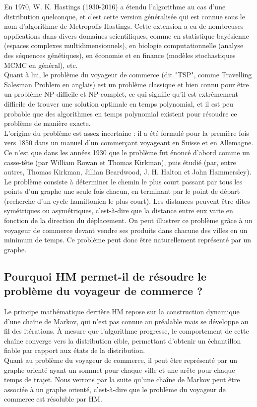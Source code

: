 \documentclass{article}
\begin{document}
En 1970, W. K. Hastings (1930-2016) a étendu l'algorithme au cas d'une distribution quelconque, et c'est cette version généralisée qui est connue sous le nom d'algorithme de Metropolis-Hastings. Cette extension a eu de nombreuses applications dans divers domaines scientifiques, comme en statistique bayésienne (espaces complexes multidimensionnels), en biologie computationnelle (analyse des séquences génétiques), en économie et en finance (modèles stochastiques MCMC en général), etc. \\

Quant à lui, le problème du voyageur de commerce (dit "TSP", comme Travelling Salesman Problem en anglais) est un problème classique et bien connu pour être un problème NP-difficile et NP-complet, ce qui signifie qu'il est extrêmement difficile de trouver une solution optimale en temps polynomial, et il est peu probable que des algorithmes en temps polynomial existent pour résoudre ce problème de manière exacte. \\
L'origine du problème est assez incertaine : il a été formulé pour la première fois vers 1850 dans un manuel d'un commerçant voyageant en Suisse et en Allemagne. Ce n'est que dans les années 1930 que le problème fut énoncé d'abord comme un casse-tête (par William Rowan et Thomas Kirkman), puis étudié (par, entre autres, Thomas Kirkman, Jillian Beardwood, J. H. Halton et John Hammersley). \\ 
Le problème consiste à déterminer le chemin le plus court passant par tous les points d'un graphe une seule fois chacun, en terminant par le point de départ (recherche d'un cycle hamiltonien le plus court). Les distances peuvent être dites symétriques ou asymétriques, c'est-à-dire que la distance entre eux varie en fonction de la direction du déplacement. On peut illustrer ce problème grâce à un voyageur de commerce devant vendre ses produits dans chacune des villes en un minimum de temps. Ce problème peut donc être naturellement représenté par un graphe.\\


\subsection{Pourquoi HM permet-il de résoudre le problème du voyageur de commerce ?}

Le principe mathématique derrière HM repose sur la construction dynamique d'une chaîne de Markov, qui n'est pas connue au préalable mais se développe au fil des itérations. À mesure que l'algorithme progresse, le comportement de cette chaîne converge vers la distribution cible, permettant d'obtenir un échantillon fiable par rapport aux états de la distribution. \\
Quant au problème du voyageur de commerce, il peut être représenté par un graphe orienté ayant un sommet pour chaque ville et une arête pour chaque temps de trajet. Nous verrons par la suite qu'une chaîne de Markov peut être associée à un graphe orienté, c'est-à-dire que le problème du voyageur de commerce est résoluble par HM. \\
\end{document}
